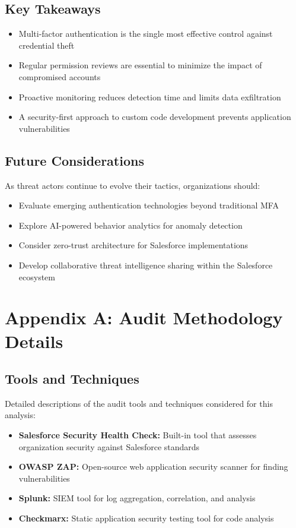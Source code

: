 \documentclass[12pt,a4paper]{article}
\begin{document}
\subsection{Key Takeaways}
\begin{itemize}
    \item Multi-factor authentication is the single most effective control against credential theft
    \item Regular permission reviews are essential to minimize the impact of compromised accounts
    \item Proactive monitoring reduces detection time and limits data exfiltration
    \item A security-first approach to custom code development prevents application vulnerabilities
\end{itemize}

\subsection{Future Considerations}
As threat actors continue to evolve their tactics, organizations should:
\begin{itemize}
    \item Evaluate emerging authentication technologies beyond traditional MFA
    \item Explore AI-powered behavior analytics for anomaly detection
    \item Consider zero-trust architecture for Salesforce implementations
    \item Develop collaborative threat intelligence sharing within the Salesforce ecosystem
\end{itemize}




\clearpage
\appendix
\section{Appendix A: Audit Methodology Details}
\subsection{Tools and Techniques}
Detailed descriptions of the audit tools and techniques considered for this analysis:
\begin{itemize}
    \item \textbf{Salesforce Security Health Check:} Built-in tool that assesses organization security against Salesforce standards
    \item \textbf{OWASP ZAP:} Open-source web application security scanner for finding vulnerabilities
    \item \textbf{Splunk:} SIEM tool for log aggregation, correlation, and analysis
    \item \textbf{Checkmarx:} Static application security testing tool for code analysis
\end{itemize}
\end{document}
